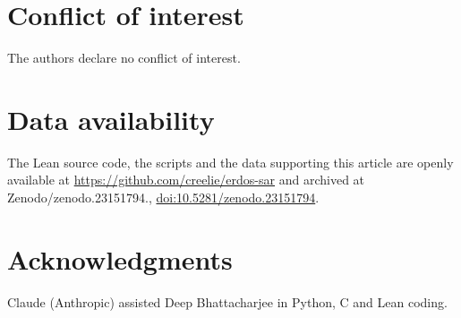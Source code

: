 \documentclass[11pt,a4paper]{article}
\theoremstyle{definition}
\theoremstyle{remark}
\def\zenodoDOI{10.5281/zenodo.23151794}
\begin{document}
\section*{Conflict of interest}
The authors declare no conflict of interest.

\section*{Data availability}
The Lean source code, the scripts and the data supporting this article are openly available at
\url{https://github.com/creelie/erdos-sar} and archived at
Zenodo\ifx\zenodoDOI\empty.\else, \href{https://doi.org/\zenodoDOI}{doi:\zenodoDOI}.\fi

\section*{Acknowledgments}
Claude (Anthropic) assisted Deep Bhattacharjee in Python, C and Lean coding.
\end{document}
